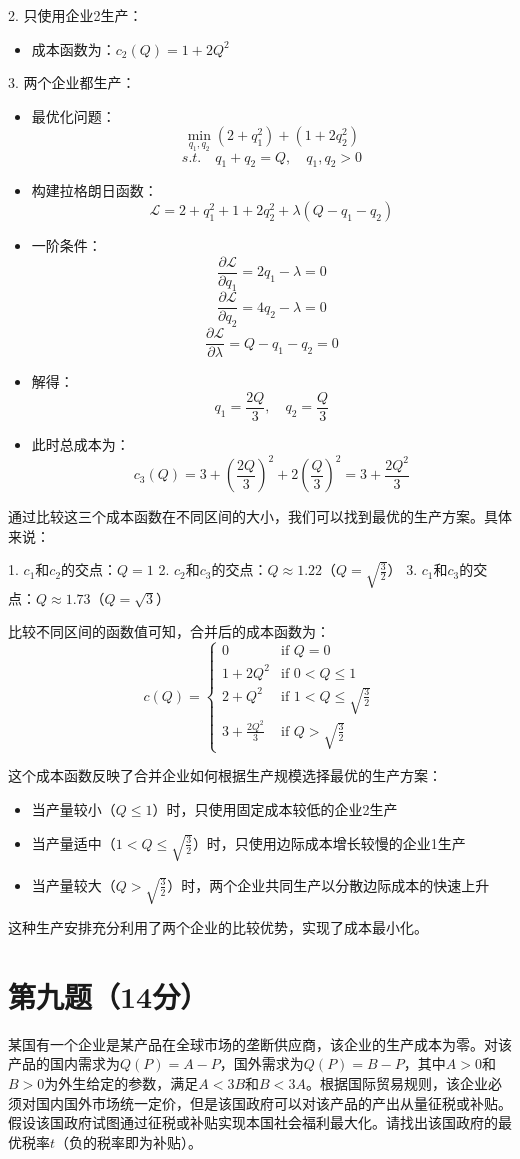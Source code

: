 \documentclass[12pt]{article}
\begin{document}
2. 只使用企业2生产：
\begin{itemize}
\item 成本函数为：$c_2(Q)=1+2Q^2$
\end{itemize}

3. 两个企业都生产：
\begin{itemize}
\item 最优化问题：
\[\min_{q_1,q_2} (2+q_1^2)+(1+2q_2^2)\]
\[s.t. \quad q_1+q_2=Q, \quad q_1,q_2>0\]
\item 构建拉格朗日函数：
\[\mathcal{L}=2+q_1^2+1+2q_2^2+\lambda(Q-q_1-q_2)\]
\item 一阶条件：
\[\frac{\partial \mathcal{L}}{\partial q_1}=2q_1-\lambda=0\]
\[\frac{\partial \mathcal{L}}{\partial q_2}=4q_2-\lambda=0\]
\[\frac{\partial \mathcal{L}}{\partial \lambda}=Q-q_1-q_2=0\]
\item 解得：
\[q_1=\frac{2Q}{3}, \quad q_2=\frac{Q}{3}\]
\item 此时总成本为：
\[c_3(Q)=3+(\frac{2Q}{3})^2+2(\frac{Q}{3})^2=3+\frac{2Q^2}{3}\]
\end{itemize}

通过比较这三个成本函数在不同区间的大小，我们可以找到最优的生产方案。具体来说：

1. $c_1$和$c_2$的交点：$Q=1$
2. $c_2$和$c_3$的交点：$Q\approx1.22$（$Q=\sqrt{\frac{3}{2}}$）
3. $c_1$和$c_3$的交点：$Q\approx1.73$（$Q=\sqrt{3}$）

比较不同区间的函数值可知，合并后的成本函数为：
\[c(Q)=\begin{cases}
0 & \text{if }Q=0 \\
1+2Q^2 & \text{if }0<Q\leq1 \\
2+Q^2 & \text{if }1<Q\leq\sqrt{\frac{3}{2}} \\
3+\frac{2Q^2}{3} & \text{if }Q>\sqrt{\frac{3}{2}}
\end{cases}\]

这个成本函数反映了合并企业如何根据生产规模选择最优的生产方案：
\begin{itemize}
\item 当产量较小（$Q\leq1$）时，只使用固定成本较低的企业2生产
\item 当产量适中（$1<Q\leq\sqrt{\frac{3}{2}}$）时，只使用边际成本增长较慢的企业1生产
\item 当产量较大（$Q>\sqrt{\frac{3}{2}}$）时，两个企业共同生产以分散边际成本的快速上升
\end{itemize}

这种生产安排充分利用了两个企业的比较优势，实现了成本最小化。

\section*{第九题（14分）}
某国有一个企业是某产品在全球市场的垄断供应商，该企业的生产成本为零。对该产品的国内需求为$Q(P)=A-P$，国外需求为$Q(P)=B-P$，其中$A>0$和$B>0$为外生给定的参数，满足$A<3B$和$B<3A$。根据国际贸易规则，该企业必须对国内国外市场统一定价，但是该国政府可以对该产品的产出从量征税或补贴。假设该国政府试图通过征税或补贴实现本国社会福利最大化。请找出该国政府的最优税率$t$（负的税率即为补贴）。
\end{document}

